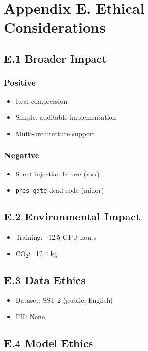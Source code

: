 \section{Appendix E. Ethical Considerations}

\subsection{E.1 Broader Impact}

\subsubsection{Positive}
\begin{itemize}
\item Real compression
\item Simple, auditable implementation
\item Multi-architecture support

\end{itemize}
\subsubsection{Negative}
\begin{itemize}
\item Silent injection failure (risk)
\item \texttt{pres\_gate} dead code (minor)

\end{itemize}
\subsection{E.2 Environmental Impact}

\begin{itemize}
\item Training: ~12.5 GPU-hours
\item CO$_2$: ~12.4 kg

\end{itemize}
\subsection{E.3 Data Ethics}

\begin{itemize}
\item Dataset: SST-2 (public, English)
\item PII: None

\end{itemize}
\subsection{E.4 Model Ethics}

